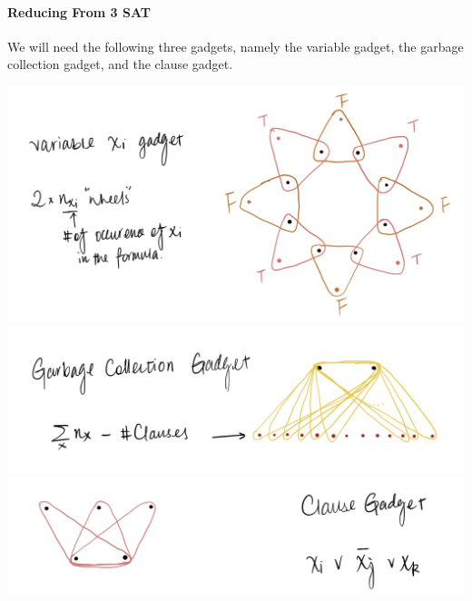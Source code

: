 \documentclass[10pt]{article}
\begin{document}
\paragraph{Reducing From 3 SAT} 
We will need the following three gadgets, namely the variable gadget, the garbage collection gadget, and the clause gadget. 
\begin{center}
    \includegraphics[scale=0.22]{img/3dm_variable.jpg}
    \includegraphics[scale=0.22]{img/3dm_garbage.jpg}
    \includegraphics[scale=0.22]{img/3dm_clause.jpg}
\end{center}
\end{document}
